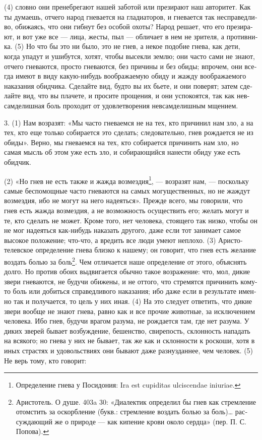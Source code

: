 (4) слов­но они пре­не­бре­га­ют нашей заботой или пре­зи­ра­ют наш авто­ри­тет. Как ты дума­ешь, отче­го народ гне­ва­ет­ся на гла­ди­а­то­ров, и гне­ва­ет­ся так неспра­вед­ли­во, оби­жа­ясь, что они гиб­нут без осо­бой охоты? Народ реша­ет, что его пре­зи­ра­ют, и вот уже все --- лица, жесты, пыл --- обли­ча­ет в нем не зри­те­ля, а про­тив­ни­ка. (5) Но что бы это ни было, это не гнев, а некое подо­бие гне­ва, как дети, когда упа­дут и уши­бут­ся, хотят, чтобы высек­ли зем­лю; они часто сами не зна­ют, отче­го гне­ва­ют­ся, про­сто гне­ва­ют­ся, без при­чи­ны и без обиды; впро­чем, они все­гда име­ют в виду какую-нибудь вооб­ра­жае­мую обиду и жаж­ду вооб­ра­жае­мо­го нака­за­ния обид­чи­ка. Сде­лай­те вид, буд­то вы их бье­те, и они пове­рят; затем сде­лай­те вид, что вы пла­че­те, и про­си­те про­ще­ния, и они успо­ко­ят­ся, так как нев­сам­де­лиш­ная боль про­хо­дит от удо­вле­тво­ре­ния нев­сам­де­лиш­ным мще­ни­ем.

3. (1) Нам воз­ра­зят: «Мы часто гне­ва­ем­ся не на тех, кто при­чи­нил нам зло, а на тех, кто еще толь­ко соби­ра­ет­ся это сде­лать; сле­до­ва­тель­но, гнев рож­да­ет­ся не из обиды». Вер­но, мы гне­ва­ем­ся на тех, кто соби­ра­ет­ся при­чи­нить нам зло, но самая мысль об этом уже есть зло, и соби­раю­щий­ся нане­сти обиду уже есть обид­чик.

(2) «Но гнев не есть так­же и жаж­да возмездия\footnote{Опре­де­ле­ние гне­ва у Посидо­ния: Ira est cupiditas ulciscendae iniuriae.}, --- воз­ра­зят нам, --- посколь­ку самые бес­по­мощ­ные часто гне­ва­ют­ся на самых могу­ще­ст­вен­ных, но не жаж­дут воз­мездия, ибо не могут на него наде­ять­ся». Преж­де все­го, мы гово­ри­ли, что гнев есть жаж­да воз­мездия, а не воз­мож­ность осу­ще­ст­вить его; желать могут и те, кто сде­лать не может. Кро­ме того, нет чело­ве­ка, сто­я­ще­го так низ­ко, чтобы он не мог наде­ять­ся как-нибудь нака­зать дру­го­го, даже если тот зани­ма­ет самое высо­кое поло­же­ние; что-что, а вредить все люди уме­ют непло­хо. (3) Ари­сто­телев­ское опре­де­ле­ние гне­ва близ­ко к наше­му; он гово­рит, что гнев есть жела­ние воздать болью за боль\footnote{Ари­сто­тель. О душе. 403a 30: «Диа­лек­тик опре­де­лил бы гнев как стрем­ле­ние ото­мстить за оскорб­ле­ние (букв.: стрем­ле­ние воздать болью за боль)… рас­суж­даю­щий же о при­ро­де --- как кипе­ние кро­ви око­ло серд­ца» (пер. П. С. Попо­ва).}. Чем отли­ча­ет­ся наше опре­де­ле­ние от это­го, объ­яс­нять дол­го. Но про­тив обо­их выдви­га­ет­ся обыч­но такое воз­ра­же­ние: что, мол, дикие зве­ри гне­ва­ют­ся, не будучи оби­же­ны, и не отто­го, что стре­мят­ся при­чи­нить кому-то боль или добить­ся спра­вед­ли­во­го нака­за­ния; ибо даже если в резуль­та­те имен­но так и полу­ча­ет­ся, то цель у них иная. (4) На это сле­ду­ет отве­тить, что дикие зве­ри вооб­ще не зна­ют гне­ва, рав­но как и все про­чие живот­ные, за исклю­че­ни­ем чело­ве­ка. Ибо гнев, будучи вра­гом разу­ма, не рож­да­ет­ся там, где нет разу­ма. У диких зве­рей быва­ет воз­буж­де­ние, бешен­ство, сви­ре­пость, склон­ность напа­дать на вся­ко­го; но гне­ва у них не быва­ет, так же как и склон­но­сти к рос­ко­ши, хотя в иных стра­стях и удо­воль­ст­ви­ях они быва­ют даже раз­нуздан­нее, чем чело­век. (5) Не верь тому, кто гово­рит:

